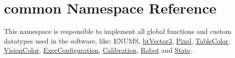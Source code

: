 \hypertarget{namespacecommon}{\section{common Namespace Reference}
\label{namespacecommon}
}


This namespace is responsible to implement all global functions and custom datatypes used in the software, like\-: E\-N\-U\-M\-S, \hyperlink{structcommon_1_1btVector3}{bt\-Vector3}, \hyperlink{structcommon_1_1Pixel}{Pixel}, \hyperlink{structcommon_1_1TableColor}{Table\-Color}, \hyperlink{structcommon_1_1VisionColor}{Vision\-Color}, \hyperlink{structcommon_1_1ExecConfiguration}{Exec\-Configuration}, \hyperlink{structcommon_1_1Calibration}{Calibration}, \hyperlink{structcommon_1_1Robot}{Robot} and \hyperlink{structcommon_1_1State}{State}.  


